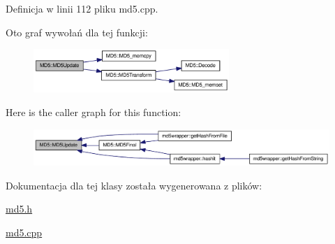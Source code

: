 Definicja w linii 112 pliku md5.cpp.

Oto graf wywołań dla tej funkcji:\nopagebreak
\begin{figure}[H]
\begin{center}
\leavevmode
\includegraphics[width=210pt]{d7/d46/a00002_a59116f0a26354a217fa186a43cd9d28_cgraph}
\end{center}
\end{figure}


Here is the caller graph for this function:\nopagebreak
\begin{figure}[H]
\begin{center}
\leavevmode
\includegraphics[width=320pt]{d7/d46/a00002_a59116f0a26354a217fa186a43cd9d28_icgraph}
\end{center}
\end{figure}


Dokumentacja dla tej klasy została wygenerowana z plików:\begin{CompactItemize}
\item 
\hyperlink{a00011}{md5.h}\item 
\hyperlink{a00010}{md5.cpp}\end{CompactItemize}
